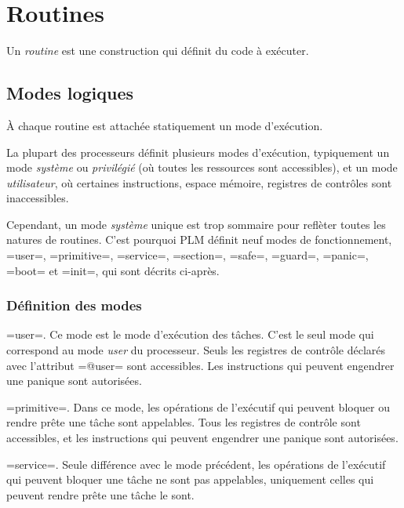 




\chapter{Routines}

Un \emph{routine} est une construction qui définit du code à exécuter.



\section{Modes logiques}

À chaque routine est attachée statiquement un mode d'exécution.

La plupart des processeurs définit plusieurs modes d'exécution, typiquement un mode \emph{système} ou \emph{privilégié} (où toutes les ressources sont accessibles), et un mode \emph{utilisateur}, où certaines instructions, espace mémoire, registres de contrôles sont inaccessibles.

Cependant, un mode \emph{système} unique est trop sommaire pour reflèter toutes les natures de routines. C'est pourquoi PLM définit neuf modes de fonctionnement, \plm=user=, \plm=primitive=, \plm=service=, \plm=section=, \plm=safe=, \plm=guard=, \plm=panic=, \plm=boot= et \plm=init=, qui sont décrits ci-après.

\subsection{Définition des modes}

\plm=user=. Ce mode est le mode d'exécution des tâches. C'est le seul mode qui correspond au mode \emph{user} du processeur. Seuls les registres de contrôle déclarés avec l'attribut \plm=@user= sont accessibles. Les instructions qui peuvent engendrer une panique sont autorisées.

\plm=primitive=. Dans ce mode, les opérations de l'exécutif qui peuvent bloquer ou rendre prête une tâche sont appelables. Tous les registres de contrôle sont accessibles, et les instructions qui peuvent engendrer une panique sont autorisées. 

\plm=service=. Seule différence avec le mode précédent, les opérations de l'exécutif qui peuvent bloquer une tâche ne sont pas appelables, uniquement celles qui peuvent rendre prête une tâche le sont.

